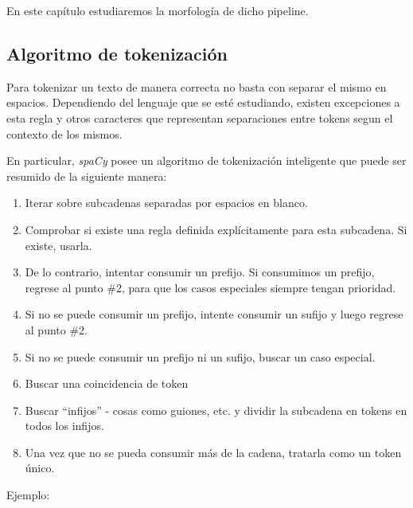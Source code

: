\documentclass[12pt,a4paper,]{scrartcl}
\providecommand{\tightlist}{%
  \setlength{\itemsep}{0pt}\setlength{\parskip}{0pt}}
\begin{document}
En este capítulo estudiaremos la morfología de dicho pipeline.

\hypertarget{algoritmo-de-tokenizaciuxf3n}{%
\subsection{Algoritmo de tokenización}\label{algoritmo-de-tokenizaciuxf3n}}

Para tokenizar un texto de manera correcta no basta con separar el mismo en espacios. Dependiendo del lenguaje que se esté estudiando, existen excepciones a esta regla y otros caracteres que representan separaciones entre tokens segun el contexto de los mismos.

En particular, \emph{spaCy} posee un algoritmo de tokenización inteligente que puede ser resumido de la siguiente manera:

\begin{enumerate}
\def\labelenumi{\arabic{enumi}.}
\tightlist
\item
  Iterar sobre subcadenas separadas por espacios en blanco.
\item
  Comprobar si existe una regla definida explícitamente para esta subcadena. Si existe, usarla.
\item
  De lo contrario, intentar consumir un prefijo. Si consumimos un prefijo, regrese al punto \#2, para que los casos especiales siempre tengan prioridad.
\item
  Si no se puede consumir un prefijo, intente consumir un sufijo y luego regrese al punto \#2.
\item
  Si no se puede consumir un prefijo ni un sufijo, buscar un caso especial.
\item
  Buscar una coincidencia de token
\item
  Buscar \enquote{infijos} - cosas como guiones, etc. y dividir la subcadena en tokens en todos los infijos.
\item
  Una vez que no se pueda consumir más de la cadena, tratarla como un token único.
\end{enumerate}

Ejemplo:
\end{document}
